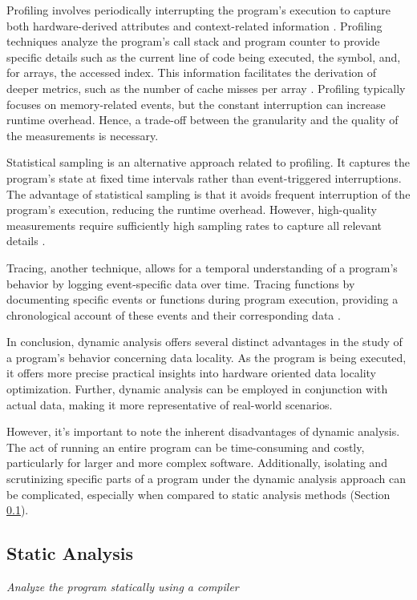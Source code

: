 Profiling involves periodically interrupting the program's execution to capture both hardware-derived attributes and context-related information \cite{itzkowitz2003memory,gimenez2017memaxes,adhianto2010hpctoolkit}. Profiling techniques analyze the program's call stack and program counter to provide specific details such as the current line of code being executed, the symbol, and, for arrays, the accessed index. This information facilitates the derivation of deeper metrics, such as the number of cache misses per array \cite{adhianto2010hpctoolkit}. Profiling typically focuses on memory-related events, but the constant interruption can increase runtime overhead. Hence, a trade-off between the granularity and the quality of the measurements is necessary.

Statistical sampling is an alternative approach related to profiling. It captures the program's state at fixed time intervals rather than event-triggered interruptions. The advantage of statistical sampling is that it avoids frequent interruption of the program's execution, reducing the runtime overhead. However, high-quality measurements require sufficiently high sampling rates to capture all relevant details \cite{adhianto2010hpctoolkit}.

Tracing, another technique, allows for a temporal understanding of a program's behavior by logging event-specific data over time. Tracing functions by documenting specific events or functions during program execution, providing a chronological account of these events and their corresponding data \cite{shende1999profiling,adhianto2010hpctoolkit,mckinley1999quantifying}.

In conclusion, dynamic analysis offers several distinct advantages in the study of a program's behavior concerning data locality. As the program is being executed, it offers more precise practical insights into hardware oriented data locality optimization. Further, dynamic analysis can be employed in conjunction with actual data, making it more representative of real-world scenarios.

However, it's important to note the inherent disadvantages of dynamic analysis. The act of running an entire program can be time-consuming and costly, particularly for larger and more complex software. Additionally, isolating and scrutinizing specific parts of a program under the dynamic analysis approach can be complicated, especially when compared to static analysis methods (Section \ref{sec:static_analysis}).

\subsection{Static Analysis}\label{sec:static_analysis}
\textit{Analyze the program statically using a compiler}
\cite{schaad2022boosting,schaad2021boosting,ben2019statefulSDFG,matwin1985prograph,kodosky2020labview,calotoiu2022lifting,ben2023bridging}

